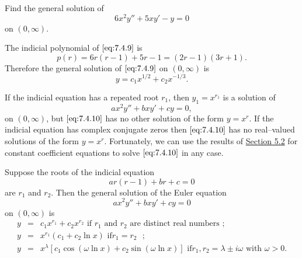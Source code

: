 \documentclass{ximera}
\begin{document}
\begin{example}\label{example:7.4.5}
  Find the general solution of
\begin{equation} \label{eq:7.4.9}
6x^2y''+5xy'-y=0
\end{equation}
on  $(0,\infty)$.
\begin{explanation}
The indicial polynomial of $\eqref{eq:7.4.9}$ is
$$
p(r)=6r(r-1)+5r-1=(2r-1)(3r+1).
$$
Therefore the general solution of $\eqref{eq:7.4.9}$ on
$(0,\infty)$ is
$$
y=c_1x^{1/2}+c_2x^{-1/3}.
$$
\end{explanation}
\end{example}



If the indicial equation  has a repeated root $r_1$, then
$y_1=x^{r_1}$ is a solution of
\begin{equation} \label{eq:7.4.10}
ax^2y''+bxy'+cy=0,
\end{equation}
on $(0,\infty)$, but $\eqref{eq:7.4.10}$ has no other solution of the form
$y=x^r$. If the indicial equation has complex conjugate zeros then
$\eqref{eq:7.4.10}$ has no real--valued solutions of the form $y=x^r$.
Fortunately, we can use the results of 
\href{https://xerxes.ximera.org/differentialequations/main/constantCoefficientHomogeneousEquations/constantCoefficientHomogeneousEquations}{Section 5.2} 
for constant coefficient equations to solve $\eqref{eq:7.4.10}$ in any case.

\begin{theorem}\label{thmtype:7.4.3}
Suppose the roots of the indicial equation
\begin{equation}
\label{eq:7.4.11} ar(r-1)+br+c=0
\end{equation}
are $r_1$ and $r_2$. Then the general solution of the Euler equation
\begin{equation} \label{eq:7.4.12}
ax^2y''+bxy'+cy=0
\end{equation}
 on  $(0,\infty)$ is
\begin{eqnarray*}
y&=&c_1x^{r_1}+c_2x^{r_2}\mbox{ if $r_1$ and $r_2$ are distinct
real numbers  };
\\ y&=&x^{r_1}(c_1+c_2\ln x)\mbox{ if
$r_1=r_2$  };
\\ y&=&x^{\lambda}\left[c_1\cos\left(\omega\ln x\right)+
c_2\sin\left(\omega\ln x \right)\right]\mbox{ if
$r_1,r_2=\lambda\pm i\omega$ with $\omega>0$}.
\end{eqnarray*}
\end{theorem}
\end{document}
